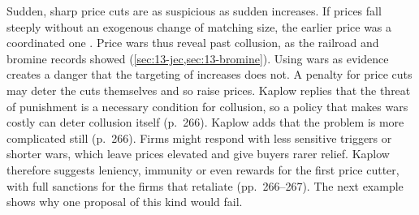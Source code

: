 Sudden, sharp price cuts are as suspicious as sudden increases. If prices fall steeply without an exogenous change
of matching size, the earlier price was a coordinated one \citep[p.~265]{Kaplow2013}. Price wars thus reveal past
collusion, as the railroad and bromine records showed (\cref{sec:13-jec,sec:13-bromine}). Using wars as evidence
creates a danger that the targeting of increases does not. A penalty for price cuts may deter the cuts themselves
and so raise prices. Kaplow replies that the threat of punishment is a necessary condition for collusion, so a
policy that makes wars costly can deter collusion itself (p.~266). Kaplow adds that the problem is more
complicated still (p.~266). Firms might respond
with less sensitive triggers or shorter wars, which leave prices elevated and give buyers rarer relief. Kaplow
therefore suggests leniency, immunity or even rewards for the first price cutter, with full sanctions for the
firms that retaliate (pp.~266--267). The next example shows why one proposal of this kind would fail.

